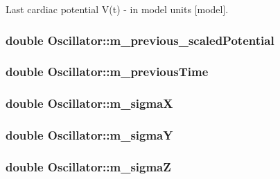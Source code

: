 Last cardiac potential V(t) -\/ in model units \mbox{[}model\mbox{]}. 

\hypertarget{class_oscillator_a45a1214b84b342e4ee078d218112f001}{
\subsubsection[{m\+\_\+previous\+\_\+scaled\+Potential}]{\setlength{\rightskip}{0pt plus 5cm}double Oscillator\+::m\+\_\+previous\+\_\+scaled\+Potential}}\label{class_oscillator_a45a1214b84b342e4ee078d218112f001}
\hypertarget{class_oscillator_ab97f31715485a24f49c98a01caa9f2d8}{
\subsubsection[{m\+\_\+previous\+Time}]{\setlength{\rightskip}{0pt plus 5cm}double Oscillator\+::m\+\_\+previous\+Time}}\label{class_oscillator_ab97f31715485a24f49c98a01caa9f2d8}
\hypertarget{class_oscillator_aa0fe6259ca35433e3bd0dbac2d0ead65}{
\subsubsection[{m\+\_\+sigma\+X}]{\setlength{\rightskip}{0pt plus 5cm}double Oscillator\+::m\+\_\+sigma\+X}}\label{class_oscillator_aa0fe6259ca35433e3bd0dbac2d0ead65}
\hypertarget{class_oscillator_a253c7652df4789833c9f940c3278036d}{
\subsubsection[{m\+\_\+sigma\+Y}]{\setlength{\rightskip}{0pt plus 5cm}double Oscillator\+::m\+\_\+sigma\+Y}}\label{class_oscillator_a253c7652df4789833c9f940c3278036d}
\hypertarget{class_oscillator_af8ba90eb71c73ac1c789d569e7e2f92f}{
\subsubsection[{m\+\_\+sigma\+Z}]{\setlength{\rightskip}{0pt plus 5cm}double Oscillator\+::m\+\_\+sigma\+Z}}\label{class_oscillator_af8ba90eb71c73ac1c789d569e7e2f92f}
